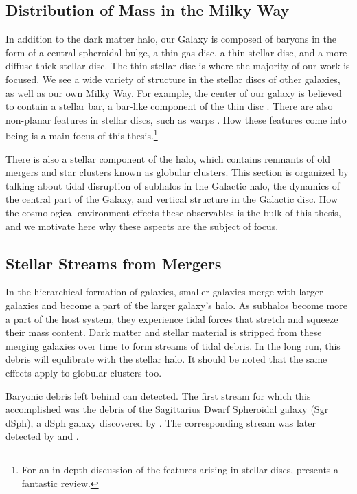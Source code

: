 \subsection{Distribution of Mass in the Milky Way}

In addition to the dark matter halo, our Galaxy is composed of baryons in the form of a central spheroidal bulge, a thin gas disc, a thin stellar disc, and a more diffuse thick stellar disc. The thin stellar disc is where the majority of our work is focused. We see a wide variety of structure in the stellar discs of other galaxies, as well as our own Milky Way. For example, the center of our galaxy is believed to contain a stellar bar, a bar-like component of the thin disc \citep{BT}. There are also non-planar features in stellar discs, such as warps \citep{BT}. How these features come into being is a main focus of this thesis.\footnote{For an in-depth discussion of the features arising in stellar discs, \citet{Sellwood2013} presents a fantastic review.}

There is also a stellar component of the halo, which contains remnants of old mergers and star clusters known as globular clusters. This section is organized by talking about tidal disruption of subhalos in the Galactic halo, the dynamics of the central part of the Galaxy, and vertical structure in the Galactic disc. How the cosmological environment effects these observables is the bulk of this thesis, and we motivate here why these aspects are the subject of focus.

\subsection{Stellar Streams from Mergers}

In the hierarchical formation of galaxies, smaller galaxies merge with larger galaxies and become a part of the larger galaxy's halo. As subhalos become more a part of the host system, they experience tidal forces that stretch and squeeze their mass content. Dark matter and stellar material is stripped from these merging galaxies over time to form streams of tidal debris. In the long run, this debris will equlibrate with the stellar halo. It should be noted that the same effects apply to globular clusters too.

Baryonic debris left behind can detected. The first stream for which this accomplished was the debris of the Sagittarius Dwarf Spheroidal galaxy (Sgr dSph), a dSph galaxy discovered by \citet{ibata_discovery}. The corresponding stream was later detected by \citet{newberg_2002} and \citet{majewski_2003}. 

